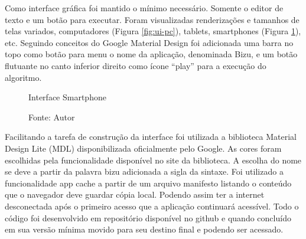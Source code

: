 Como interface gráfica foi mantido o mínimo necessário. Somente o editor de texto e um botão para executar. Foram visualizadas renderizações e tamanhos de telas variados, computadores (Figura \ref{fig:ui-pc}), tablets, smartphones (Figura \ref{fig:ui-phone}), etc. Seguindo conceitos do Google Material Design foi adicionada uma barra no topo como botão para menu o nome da aplicação, denominada Bizu, e um botão flutuante no canto inferior direito como ícone ``play'' para a execução do algoritmo.

\begin{figure}[h]
  \caption{Interface Smartphone}\label{fig:ui-phone}
  \centering
  \setlength{\fboxsep}{0pt}%
\setlength{\fboxrule}{1pt}%
  \caption*{\footnotesize Fonte: Autor}
\end{figure}

Facilitando a tarefa de construção da interface foi utilizada a biblioteca Material Design Lite (MDL) disponibilizada oficialmente pelo Google. As cores foram escolhidas pela funcionalidade disponível no site da biblioteca.
A escolha do nome se deve a partir da palavra bizu adicionada a sigla da sintaxe.
Foi utilizado a funcionalidade app cache a partir de um arquivo manifesto listando o conteúdo que o navegador deve guardar cópia local. Podendo assim ter a internet desconectada após o primeiro acesso que a aplicação continuará acessível.
Todo o código foi desenvolvido em repositório disponível no github e quando concluído em sua versão mínima movido para seu destino final e podendo ser acessado.\color{black}

